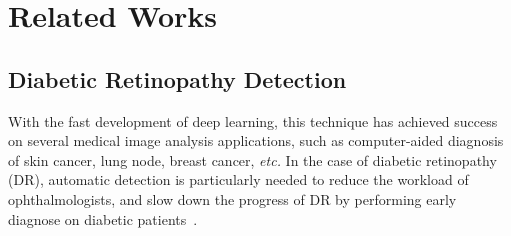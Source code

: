 \documentclass[letterpaper]{article} %
\begin{document}
	
	
	
	
	
	
	
	
	
	

	
	
	
	
	\section{Related Works}
    \subsection{Diabetic Retinopathy  Detection}
    \label{sec:DR detector}
With the fast development of deep learning, this technique has achieved success on several medical image analysis applications, such as computer-aided diagnosis of skin cancer, lung node, breast cancer, \textit{etc.} In the case of diabetic retinopathy (DR), automatic detection is particularly needed to reduce the workload of ophthalmologists, and slow down the progress of DR by performing early diagnose on diabetic patients~\cite{Gulshan2016jama}.
    
\end{document}
